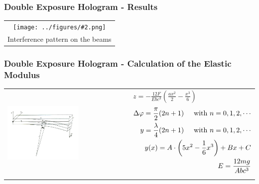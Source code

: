 \documentclass[10pt]{beamer}
\newcommand{\gra}[3][]{
	\begin{table}
	\centering
	\begin{tabular}[width=\textwidth]{c}
		\texttt{[image: ../figures/\#2.png]}\\
		\small #3
	\end{tabular}
	\end{table}
}
\newcommand{\graThree}[6][0.49]{
	\begin{tabular}[width=\textwidth]{ccc}
		\texttt{[image: ../figures/\#2.png]}&
		\texttt{[image: ../figures/\#3.png]}&
		\texttt{[image: ../figures/\#4.png]}&
		\captionof{figure}[#5]{#6}
	\end{tabular}
}
\begin{document}
\begin{frame}
	\frametitle{Double Exposure Hologram - Results}
	\gra[0.8]{staebe4}{Interference pattern on the beams}
\end{frame}

\begin{frame}
	\frametitle{Double Exposure Hologram - Calculation of the Elastic Modulus}
	\begin{table}
		\centering
		\begin{tabular}[width=\textwidth]{m{6cm}m{4cm}}
			\includegraphics[width=0.6\textwidth]{../figures/balken_biegen.png}&
			$z=-\frac{12F}{Ebc^3}\left(\frac{ax^2}{2}-\frac{x^3}{6} \right)$\newline
			\begin{align*}
			\Delta \varphi=\frac{\pi}{2}(2n+1)\hspace{0.5cm}\mbox{with }n=0,1,2,\cdots\\
			y=\frac{\lambda}{4}(2n+1)\hspace{0.5cm}\mbox{with }n=0,1,2,\cdots\\
			y(x)=A\cdot\left(5x^2-\frac{1}{6}x^3\right)+Bx+C\\
			E=\frac{12mg}{Abc^3}
			\end{align*}  
		\end{tabular}
	\end{table}
\end{frame}
\end{document}
